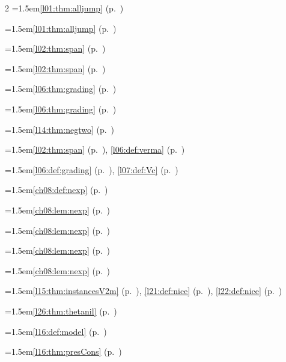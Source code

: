 \begin{multicols}{2}
\hangindent=1.5em\quad \ref{l01:thm:alljump} (p.~\pageref{l01:thm:alljump})\par
\hangindent=1.5em\quad \ref{l01:thm:alljump} (p.~\pageref{l01:thm:alljump})\par
\hangindent=1.5em\quad \ref{l02:thm:span} (p.~\pageref{l02:thm:span})\par
\hangindent=1.5em\quad \ref{l02:thm:span} (p.~\pageref{l02:thm:span})\par
\hangindent=1.5em\quad \ref{l06:thm:grading} (p.~\pageref{l06:thm:grading})\par
\hangindent=1.5em\quad \ref{l06:thm:grading} (p.~\pageref{l06:thm:grading})\par
\hangindent=1.5em\quad \ref{l14:thm:negtwo} (p.~\pageref{l14:thm:negtwo})\par
\hangindent=1.5em\quad \ref{l02:thm:span} (p.~\pageref{l02:thm:span}), \ref{l06:def:verma} (p.~\pageref{l06:def:verma})\par
\hangindent=1.5em\quad \ref{l06:def:grading} (p.~\pageref{l06:def:grading}), \ref{l07:def:Vc} (p.~\pageref{l07:def:Vc})\par
\hangindent=1.5em\quad \ref{ch08:def:nexp} (p.~\pageref{ch08:def:nexp})\par
\hangindent=1.5em\quad \ref{ch08:lem:nexp} (p.~\pageref{ch08:lem:nexp})\par
\hangindent=1.5em\quad \ref{ch08:lem:nexp} (p.~\pageref{ch08:lem:nexp})\par
\hangindent=1.5em\quad \ref{ch08:lem:nexp} (p.~\pageref{ch08:lem:nexp})\par
\hangindent=1.5em\quad \ref{ch08:lem:nexp} (p.~\pageref{ch08:lem:nexp})\par
\hangindent=1.5em\quad \ref{l15:thm:instancesV2m} (p.~\pageref{l15:thm:instancesV2m}), \ref{l21:def:nice} (p.~\pageref{l21:def:nice}), \ref{l22:def:nice} (p.~\pageref{l22:def:nice})\par
\hangindent=1.5em\quad \ref{l26:thm:thetanil} (p.~\pageref{l26:thm:thetanil})\par
\hangindent=1.5em\quad \ref{l16:def:model} (p.~\pageref{l16:def:model})\par
\hangindent=1.5em\quad \ref{l16:thm:presCons} (p.~\pageref{l16:thm:presCons})\par

\end{multicols}
